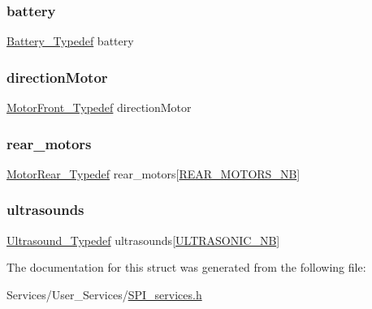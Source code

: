 \subsubsection{\texorpdfstring{battery}{battery}}
{\footnotesize\ttfamily \hyperlink{struct_battery___typedef}{Battery\+\_\+\+Typedef} battery}

\mbox{\label{struct_communication___typedef_a3a8290e3b46dab6047435b592b81efdc}} 
\subsubsection{\texorpdfstring{direction\+Motor}{directionMotor}}
{\footnotesize\ttfamily \hyperlink{struct_motor_front___typedef}{Motor\+Front\+\_\+\+Typedef} direction\+Motor}

\mbox{\label{struct_communication___typedef_a718b0adfdc43ccf0d67399e1583ac599}} 
\subsubsection{\texorpdfstring{rear\+\_\+motors}{rear\_motors}}
{\footnotesize\ttfamily \hyperlink{struct_motor_rear___typedef}{Motor\+Rear\+\_\+\+Typedef} rear\+\_\+motors\mbox{[}\hyperlink{motor__common_8h_adca07b02a9d917897a9809b7b19a2f79}{R\+E\+A\+R\+\_\+\+M\+O\+T\+O\+R\+S\+\_\+\+NB}\mbox{]}}

\mbox{\label{struct_communication___typedef_a30835d9cdfc16faa82377c90fe401538}} 
\subsubsection{\texorpdfstring{ultrasounds}{ultrasounds}}
{\footnotesize\ttfamily \hyperlink{struct_ultrasound___typedef}{Ultrasound\+\_\+\+Typedef} ultrasounds\mbox{[}\hyperlink{sensors__common_8h_a26f5abbcd6c4905330b730b809794176}{U\+L\+T\+R\+A\+S\+O\+N\+I\+C\+\_\+\+NB}\mbox{]}}



The documentation for this struct was generated from the following file\+:\begin{DoxyCompactItemize}
\item 
Services/\+User\+\_\+\+Services/\hyperlink{_s_p_i__services_8h}{S\+P\+I\+\_\+services.\+h}\end{DoxyCompactItemize}

